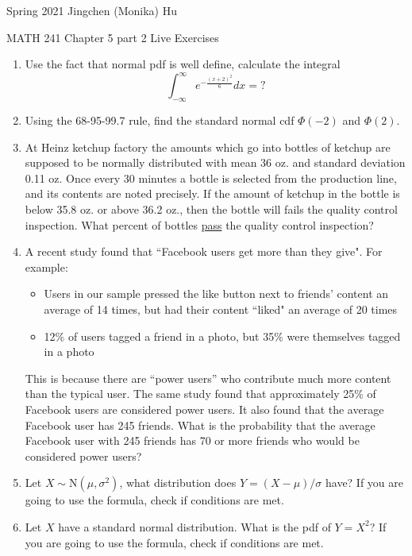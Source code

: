 \documentclass[11pt]{article}
\begin{document}
\enlargethispage{\baselineskip}

Spring 2021 \hfill Jingchen (Monika) Hu\\

\begin{center}
{\huge MATH 241 Chapter 5 part 2 Live Exercises}	\\
\end{center}
\vspace{0.5cm}

\begin{enumerate}


\item Use the fact that normal pdf is well define, calculate the integral
\[
\int_{-\infty}^{\infty} e^{-\frac{(x + 2)^2}{6}}dx = ?
\]

\item Using the 68-95-99.7 rule, find the standard normal cdf $\Phi(-2)$ and $\Phi(2)$.

\item At Heinz ketchup factory the amounts which go into bottles of ketchup are supposed to be normally distributed with mean 36 oz. and standard deviation 0.11 oz. Once every 30 minutes a bottle is selected from the production line, and its contents are noted precisely. If the amount of ketchup in the bottle is below 35.8 oz. or above 36.2 oz., then the bottle will fails the quality control inspection. What percent of bottles \underline{pass} the quality control inspection?

\item A recent study found that ``Facebook users get more than they give". For example:
\begin{itemize}
\item Users in our sample pressed the like button next to friends' content an average of 14 times, but had their content ``liked" an average of 20 times
\item 12\% of users tagged a friend in a photo, but 35\% were themselves tagged in a photo
\end{itemize}
This is because there are 	``power users'' who contribute much more content than the typical user.
The same study found that approximately 25\% of Facebook users are considered power users.
It also found that the average Facebook user has 245 friends.
What is the probability that the average Facebook user with 245 friends has 70 or more friends who would be considered power users?

\item Let $X \sim \text{N}(\mu, \sigma^2)$, what distribution does $Y = (X-\mu)/\sigma$ have? If you are going to use the formula, check if conditions are met.

\item Let $X$ have a standard normal distribution. What is the pdf of $Y = X^2$? If you are going to use the formula, check if conditions are met.

\end{enumerate}
\end{document}
